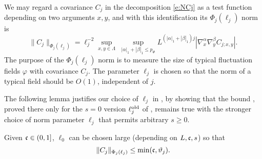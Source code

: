 We may regard a covariance $C_j$ in the decomposition \eqref{e:NCj}
as a test function depending on
two arguments $x,y$, and with this identification its $\Phi_j(\ell_j)$
norm is
\begin{equation}
    \label{e:Phinorm}
    \|C_j\|_{\Phi_{j}(\ell_j)}  =
    \ell_j^{-2}
    \sup_{x,y\in \Lambda}
    \;
    \sup_{|\alpha|_1 + |\beta|_1 \le p_\Phi}
    L^{(|\alpha|_1+  |\beta|_1)j}
    |\nabla_x^{\alpha} \nabla_y^{\beta} C_{j;x,y}|.
\end{equation}
The purpose of the $\Phi_j(\ell_j)$ norm is to measure the size of typical
fluctuation fields $\varphi$ with covariance $C_j$.
The parameter $\ell_j$ is chosen so that the norm of a typical field should
be $O(1)$, independent of $j$.

The following lemma justifies our choice of $\ell_j$
in , by showing that the
bound \cite[\eqref{IE-e:CLbd}]{BS-rg-IE}, proved there only for the $s=0$ version
$\ell_j^{\mathrm{old}}$ of ,
remains true with the stronger
choice of norm parameter $\ell_j$ that permits arbitrary $s \ge 0$.

\begin{lemma}
\label{lem:Cbd}
Given $\mathfrak{c} \in (0, 1]$, $\ell_0$ can be chosen large (depending on $L,\mathfrak{c},s$)
so that
\begin{equation}
\lbeq{Cbd}
\|C_j\|_{\Phi_{j}(\ell_j)} \leq \min(\ellconst, \chicCov_j).
\end{equation}
\end{lemma}

